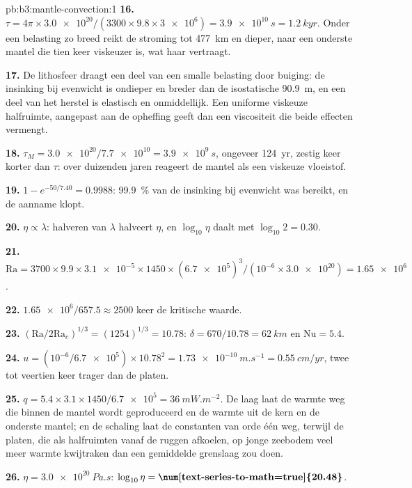 \begin{solution}{pb:b3:mantle-convection:1}
\textbf{16.} $\tau = 4\pi\times\num{3.0e20}/(3300\times9.8\times\num{3e6}) =
\qty{3.9e10}{s} = \qty{1.2}{kyr}$. Onder een belasting zo breed reikt de stroming
tot \qty{477}{km} en dieper, naar een onderste mantel die tien keer viskeuzer is,
wat haar vertraagt.

\textbf{17.} De lithosfeer draagt een deel van een smalle belasting door buiging: de insinking bij
evenwicht is ondieper en breder dan de isostatische \qty{90.9}{m}, en een deel van
het herstel is elastisch en onmiddellijk. Een uniforme viskeuze halfruimte, aangepast aan
de opheffing geeft dan een viscositeit die beide effecten vermengt.

\textbf{18.} $\tau_M = \num{3.0e20}/\num{7.7e10} = \qty{3.9e9}{s}$, ongeveer
\qty{124}{yr}, zestig keer korter dan $\tau$: over duizenden jaren reageert de
mantel als een viskeuze vloeistof.

\textbf{19.} $1 - e^{-50/7.40} = 0.9988$: \qty{99.9}{\percent} van de
insinking bij evenwicht was bereikt, en de aanname klopt.

\textbf{20.} $\eta \propto \lambda$: halveren van $\lambda$ halveert $\eta$, en
$\log_{10}\eta$ daalt met $\log_{10}2 = 0.30$.

\textbf{21.} $\mathrm{Ra} = 3700\times9.9\times\num{3.1e-5}\times1450\times
(\num{6.7e5})^3/(10^{-6}\times\num{3.0e20}) = \num{1.65e6}$.

\textbf{22.} $\num{1.65e6}/657.5 \approx 2500$ keer de kritische waarde.

\textbf{23.} $(\mathrm{Ra}/2\mathrm{Ra}_c)^{1/3} = (1254)^{1/3} = 10.78$: $\delta
= 670/10.78 = \qty{62}{km}$ en $\mathrm{Nu} = 5.4$.

\textbf{24.} $u = (10^{-6}/\num{6.7e5})\times10.78^2 = \qty{1.73e-10}{m.s^{-1}}
= \qty{0.55}{cm/yr}$, twee tot veertien keer trager dan de platen.

\textbf{25.} $q = 5.4\times3.1\times1450/\num{6.7e5} = \qty{36}{mW.m^{-2}}$. De
laag laat de warmte weg die binnen de mantel wordt geproduceerd en de warmte uit de
kern en de onderste mantel; en de schaling laat de constanten van orde één weg,
terwijl de platen, die als halfruimten vanaf de ruggen afkoelen, op jonge zeebodem
veel meer warmte kwijtraken dan een gemiddelde grenslaag zou doen.

\textbf{26.} $\eta = \qty{3.0e20}{Pa.s}$: $\log_{10}\eta =
\textbf{\num[text-series-to-math=true]{20.48}}$.
\end{solution}
